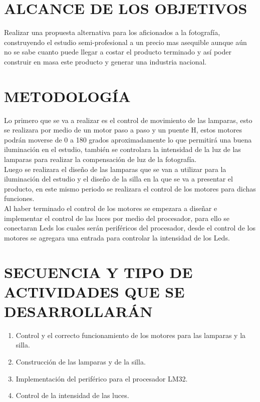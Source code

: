 \documentclass[10pt,graphicx,caption,rotating]{article}
\begin{document}
\section{ALCANCE DE LOS OBJETIVOS}
\noindent
Realizar una propuesta alternativa para los aficionados a la fotografía, construyendo el estudio semi-profesional a un precio mas asequible aunque aún no se sabe cuanto puede llegar a costar el producto terminado y así poder construir en masa este producto y generar una industria nacional.\\


\section{METODOLOGÍA}
\noindent
Lo primero que se va a realizar es el control de movimiento de las lamparas, esto se realizara por medio de un motor paso a paso y un puente H, estos motores podrán moverse de 0 a 180 grados aproximadamente lo que permitirá una buena iluminación en el estudio, también se controlara la intensidad de la luz de las lamparas para realizar la compensación de luz de la fotografía.\\
Luego se realizara el diseño de las lamparas que se van a utilizar para la iluminación del estudio y el diseño de la silla en la que se va a presentar el producto, en este mismo periodo se realizara el control de los motores para dichas funciones.\\
Al haber terminado el control de los motores se empezara a diseñar e implementar el control de las luces por medio del procesador, para ello se conectaran Leds los cuales serán periféricos del procesador, desde el control de los motores se agregara una entrada para controlar la intensidad de los Leds.

\section{SECUENCIA Y TIPO DE ACTIVIDADES QUE SE DESARROLLARÁN}
\noindent
\begin{enumerate}
 \item Control y el correcto funcionamiento de los motores para las lamparas y la silla.
 \item Construcción de las lamparas y de la silla.
 \item Implementación del periférico para el procesador LM32.
 \item Control de la intensidad de las luces.
\end{enumerate}
\end{document}
